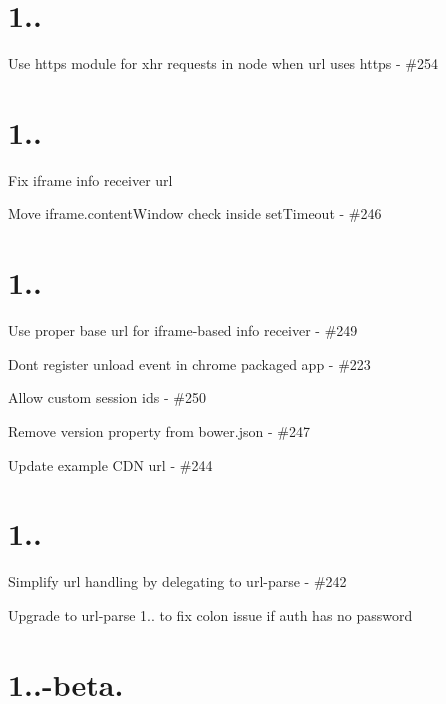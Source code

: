 \section*{1.. }


\begin{DoxyItemize}
\item Use {\ttfamily https} module for xhr requests in node when url uses https -\/ \#254
\end{DoxyItemize}

\section*{1.. }


\begin{DoxyItemize}
\item Fix iframe info receiver url
\item Move iframe.\+content\+Window check inside set\+Timeout -\/ \#246
\end{DoxyItemize}

\section*{1.. }


\begin{DoxyItemize}
\item Use proper base url for iframe-\/based info receiver -\/ \#249
\item Don\textquotesingle{}t register unload event in chrome packaged app -\/ \#223
\item Allow custom session ids -\/ \#250
\item Remove version property from bower.\+json -\/ \#247
\item Update example C\+DN url -\/ \#244
\end{DoxyItemize}

\section*{1.. }


\begin{DoxyItemize}
\item Simplify url handling by delegating to {\ttfamily url-\/parse} -\/ \#242
\item Upgrade to {\ttfamily url-\/parse} 1.. to fix colon issue if auth has no password
\end{DoxyItemize}

\section*{1..-\/beta. }



